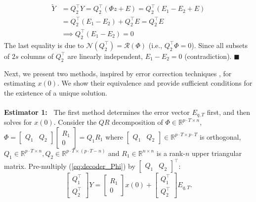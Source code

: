 \documentclass[../../thesis.tex]{subfiles}
\begin{document}
\begin{equation}
\begin{aligned}
	\tilde Y &= Q_2^\top Y =  Q_2^\top (\Phi z+E) =  Q_2^\top (E_1 - E_2 + E  ) \\
	& =  Q_2^\top(E_1-E_2) +  Q_2^\top E =  Q_2^\top E \\
	& \implies  Q_2^\top (E_1-E_2) = 0 \nonumber 
\end{aligned}
\end{equation}
The last equality is due to $\mathcal{N}(Q_2^\top) = \mathcal{R}(\Phi)$ (i.e., $Q_2^\top \Phi = 0$). Since all subsets of $2s$ columns of $Q_2^\top$ are linearly independent, $E_1 - E_2 = 0 $ (contradiction). \hfill$\blacksquare$


Next, we present two methods, inspired by error correction techniques \cite{tao11}\cite{David_Chang}, for estimating $x(0)$. We show their equivalence and provide sufficient conditions for the existence of a unique solution.\\
\\
{\bf Estimator 1:~} The first method determines the error vector $E_{q,T}$ first, and then solves for $x(0)$. 
Consider the $QR$ decomposition \cite{QRdecomp} of $\Phi \in \mathbb{R}^{p\cdot T \times n}$,
$	\Phi = \begin{bmatrix} Q_1 & Q_2 \end{bmatrix} \begin{bmatrix} R_1 \\ 0 \end{bmatrix} = Q_1 R_1 $
where $\begin{bmatrix} Q_1 & Q_2 \end{bmatrix} \in \mathbb{R}^{p\cdot T \times p\cdot T}$ is orthogonal, $Q_1 \in \mathbb{R}^{p\cdot T\times n}, Q_2 \in \mathbb{R}^{p\cdot T \times (p\cdot T-n)}$ and $R_1 \in \mathbb{R}^{n\times n}$ is a rank-$n$ upper triangular matrix. Pre-multiply (\ref{eq:decoder_Phi}) by $\begin{bmatrix} Q_1 & Q_2 \end{bmatrix} ^\top$:
\begin{equation}
	\begin{bmatrix} Q_1 ^\top \\ Q_2 ^\top \end{bmatrix} Y = \begin{bmatrix}R_1 \\ 0  \end{bmatrix} x(0) + \begin{bmatrix} Q_1 ^\top \\ Q_2^\top \end{bmatrix} E_{q,T}.
	\label{eq:QR}
\end{equation}
\end{document}
